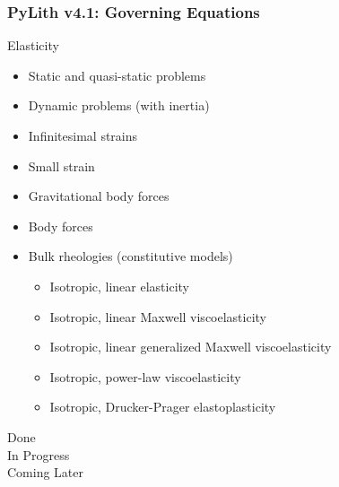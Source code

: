 \documentclass[aspectratio=169]{beamer}
\begin{document}
\newcommand{\statuslater}[1]{{\color{purple}#1}}
\newcommand{\statusdone}[1]{{\color{green}#1}}
\newcommand{\statusbuggy}[1]{{\color{red}#1}}
\newcommand{\statusinprogress}[1]{{\color{orange}#1}}
\begin{frame}
  \frametitle{PyLith v4.1: Governing Equations}
  \summary{}

  Elasticity
  \begin{itemize}
  \item \statusdone{Static and quasi-static problems}
  \item \statusinprogress{Dynamic problems (with inertia)}
  \item \statusdone{Infinitesimal strains}
  \item \statusinprogress{Small strain}
  \item \statusdone{Gravitational body forces}
  \item \statusdone{Body forces}
  \item Bulk rheologies (constitutive models)
    \begin{itemize}
    \item \statusdone{Isotropic, linear elasticity}
    \item \statusdone{Isotropic, linear Maxwell viscoelasticity}
    \item \statusdone{Isotropic, linear generalized Maxwell viscoelasticity}
    \item \statusdone{Isotropic, power-law viscoelasticity}
    \item \statusinprogress{Isotropic, Drucker-Prager elastoplasticity}
    \end{itemize}
  \end{itemize}
  \hfill%
  \begin{minipage}{0.25\textwidth}
    \statusdone{Done}\\
    \statusinprogress{In Progress}\\
    \statuslater{Coming Later}
  \end{minipage}  
\end{frame}
\end{document}
